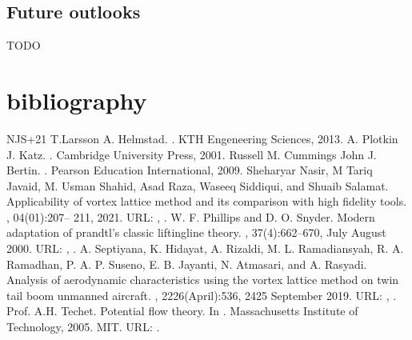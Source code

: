 \documentclass[letterpaper,10pt,english]{jupyterBook}
\begin{document}
\section{Future outlooks}
\label{\detokenize{chapters/conclusion:future-outlooks}}
\sphinxAtStartPar
TODO

\sphinxstepscope


\chapter{bibliography}
\label{\detokenize{chapters/bibliography:bibliography}}\label{\detokenize{chapters/bibliography::doc}}
\begin{sphinxthebibliography}{NJS+21}
\sphinxAtStartPar
T.Larsson A. Helmstad. . KTH Engeneering Sciences, 2013.
\sphinxAtStartPar
A. Plotkin J. Katz. . Cambridge University Press, 2001.
\sphinxAtStartPar
Russell M. Cummings John J. Bertin. . Pearson Education International, 2009.
\sphinxAtStartPar
Sheharyar Nasir, M Tariq Javaid, M. Usman Shahid, Asad Raza, Waseeq Siddiqui, and Shuaib Salamat. Applicability of vortex lattice method and its comparison with high fidelity tools. , 04(01):207– 211, 2021. URL: , .
\sphinxAtStartPar
W. F. Phillips and D. O. Snyder. Modern adaptation of prandtl's classic lifting\sphinxhyphen{}line theory. , 37(4):662–670, July \sphinxhyphen{} August 2000. URL: , .
\sphinxAtStartPar
A. Septiyana, K. Hidayat, A. Rizaldi, M. L. Ramadiansyah, R. A. Ramadhan, P. A. P. Suseno, E. B. Jayanti, N. Atmasari, and A. Rasyadi. Analysis of aerodynamic characteristics using the vortex lattice method on twin tail boom unmanned aircraft. , 2226(April):536, 24\sphinxhyphen{}25 September 2019. URL: , .
\sphinxAtStartPar
Prof. A.H. Techet. Potential flow theory. In . Massachusetts Institute of Technology, 2005. MIT. URL: .
\end{sphinxthebibliography}







\renewcommand{\indexname}{Index}
\printindex
\end{document}
